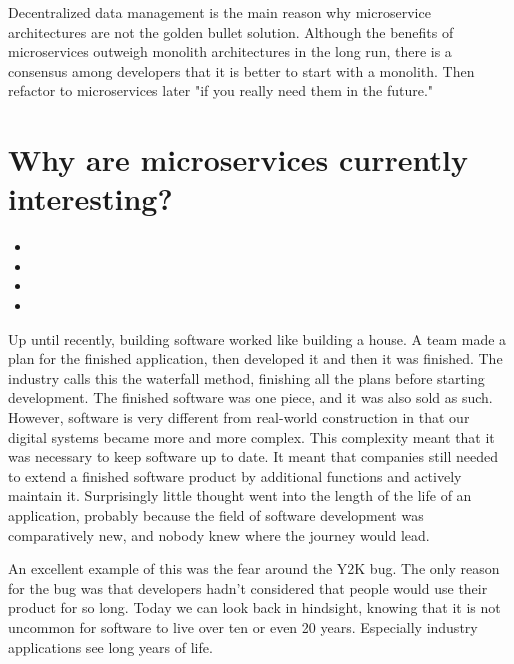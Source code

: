 Decentralized data management is the main reason why microservice architectures are not the golden bullet solution. Although the benefits of microservices outweigh monolith architectures in the long run, there is a consensus among developers that it is better to start with a monolith. Then refactor to microservices later "if you really need them in the future." ~\cite{krivtsov.2019}


\section{Why are microservices currently interesting?}

\begin{itemize}
  \item {}
  \item {}
  \item {}
  \item {}
\end{itemize}

Up until recently, building software worked like building a house. A team made a plan for the finished application, then developed it and then it was finished. The industry calls this the waterfall method, finishing all the plans before starting development. The finished software was one piece, and it was also sold as such. However, software is very different from real-world construction in that our digital systems became more and more complex. This complexity meant that it was necessary to keep software up to date. It meant that companies still needed to extend a finished software product by additional functions and actively maintain it. Surprisingly little thought went into the length of the life of an application, probably because the field of software development was comparatively new, and nobody knew where the journey would lead.

An excellent example of this was the fear around the Y2K bug. The only reason for the bug was that developers hadn't considered that people would use their product for so long. Today we can look back in hindsight, knowing that it is not uncommon for software to live over ten or even 20 years. Especially industry applications see long years of life.

